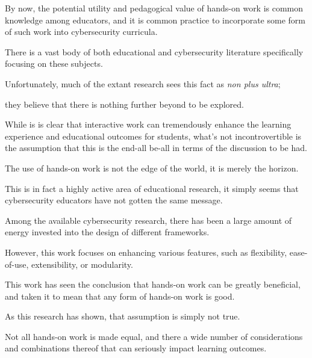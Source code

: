



By now, the potential utility and pedagogical value of hands-on work is common knowledge among educators, and it is common practice to incorporate some form of such work into cybersecurity curricula. %



There is a vast body of both educational and cybersecurity literature specifically focusing on these subjects. %



Unfortunately, much of the extant research sees this fact as \emph{non plus ultra}; %



they believe that there is nothing further beyond to be explored. %



While is is clear that interactive work can tremendously enhance the learning experience and educational outcomes for students, what's not incontrovertible is the assumption that this is the end-all be-all in terms of the discussion to be had. %



The use of hands-on work is not the edge of the world, it is merely the horizon. %



This is in fact a highly active area of educational research, it simply seems that cybersecurity educators have not gotten the same message. 







Among the available cybersecurity research, there has been a large amount of energy invested into the design of different frameworks. %



However, this work focuses on enhancing various features, such as flexibility, ease-of-use, extensibility, or modularity. %



This work has seen the conclusion that hands-on work can be greatly beneficial, and taken it to mean that any form of hands-on work is good. %



As this research has shown, that assumption is simply not true. 







Not all hands-on work is made equal, and there a wide number of considerations and combinations thereof that can seriously impact learning outcomes. %



